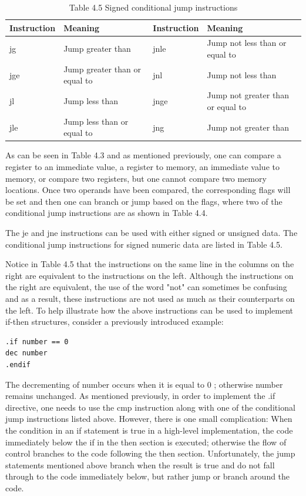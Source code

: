 \documentclass[10pt]{article}
\begin{document}
\begin{table}[h]
\begin{center}
\captionsetup{labelformat=empty}
\caption{Table 4.5 Signed conditional jump instructions}
\begin{tabular}{|l|l|l|l|}
\hline
Instruction & Meaning & Instruction & Meaning \\
\hline
jg & Jump greater than & jnle & Jump not less than or equal to \\
\hline
jge & Jump greater than or equal to & jnl & Jump not less than \\
\hline
jl & Jump less than & jnge & Jump not greater than or equal to \\
\hline
jle & Jump less than or equal to & jng & Jump not greater than \\
\hline
\end{tabular}
\end{center}
\end{table}

As can be seen in Table 4.3 and as mentioned previously, one can compare a register to an immediate value, a register to memory, an immediate value to memory, or compare two registers, but one cannot compare two memory locations. Once two operands have been compared, the corresponding flags will be set and then one can branch or jump based on the flags, where two of the conditional jump instructions are as shown in Table 4.4.

The je and jne instructions can be used with either signed or unsigned data. The conditional jump instructions for signed numeric data are listed in Table 4.5.

Notice in Table 4.5 that the instructions on the same line in the columns on the right are equivalent to the instructions on the left. Although the instructions on the right are equivalent, the use of the word "not" can sometimes be confusing and as a result, these instructions are not used as much as their counterparts on the left. To help illustrate how the above instructions can be used to implement if-then structures, consider a previously introduced example:

\begin{verbatim}
.if number == 0
dec number
.endif
\end{verbatim}

The decrementing of number occurs when it is equal to 0 ; otherwise number remains unchanged. As mentioned previously, in order to implement the .if directive, one needs to use the cmp instruction along with one of the conditional jump instructions listed above. However, there is one small complication: When the condition in an if statement is true in a high-level implementation, the code immediately below the if in the then section is executed; otherwise the flow of control branches to the code following the then section. Unfortunately, the jump statements mentioned above branch when the result is true and do not fall through to the code immediately below, but rather jump or branch around the code.
\end{document}
